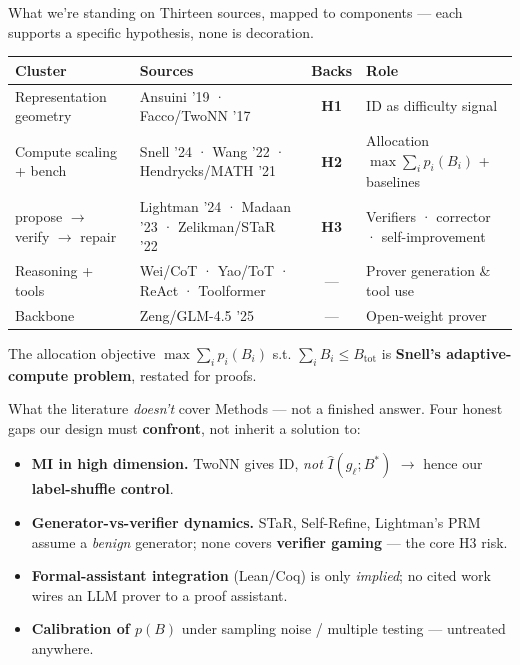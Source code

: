 \documentclass[aspectratio=169,12pt,t,compress]{beamer}
\begin{document}
\begin{frame}{What we're standing on}
	Thirteen sources, mapped to components --- each supports a specific
	hypothesis, none is decoration.

	\vspace{0.4em}
	\begin{center}
		\scriptsize
		\renewcommand{\arraystretch}{1.2}
		\begin{tabular}{p{2.7cm} p{4.1cm} c p{3.4cm}}
			\toprule
			\textbf{Cluster} & \textbf{Sources} & \textbf{Backs} & \textbf{Role} \\
			\midrule
			Representation geometry & Ansuini '19 · Facco/TwoNN '17 & \textbf{H1} & ID as difficulty signal \\
			Compute scaling + bench & Snell '24 · Wang '22 · Hendrycks/MATH '21 & \textbf{H2} & Allocation $\max\sum_i p_i(B_i)$ + baselines \\
			propose $\to$ verify $\to$ repair & Lightman '24 · Madaan '23 · Zelikman/STaR '22 & \textbf{H3} & Verifiers · corrector · self-improvement \\
			Reasoning + tools & Wei/CoT · Yao/ToT · ReAct · Toolformer & --- & Prover generation \& tool use \\
			Backbone & Zeng/GLM-4.5 '25 & --- & Open-weight prover \\
			\bottomrule
		\end{tabular}
	\end{center}

	\vspace{0.3em}
	\footnotesize The allocation objective
	$\max\sum_i p_i(B_i)$ s.t. $\sum_i B_i \le B_\text{tot}$ is
	\textbf{Snell's adaptive-compute problem}, restated for proofs.
\end{frame}

\begin{frame}{What the literature \emph{doesn't} cover}
	Methods --- not a finished answer. Four honest gaps our design must
	\textbf{confront}, not inherit a solution to:

	\vspace{0.4em}
	\begin{itemize}\footnotesize
		\item \textbf{MI in high dimension.} TwoNN gives ID, \emph{not}
		      $\hat{I}(g_\ell; B^*)$ $\to$ hence our \textbf{label-shuffle control}.
		\item \textbf{Generator-vs-verifier dynamics.} STaR, Self-Refine, Lightman's
		      PRM assume a \emph{benign} generator; none covers \textbf{verifier
		      gaming} --- the core H3 risk.
		\item \textbf{Formal-assistant integration} (Lean/Coq) is only \emph{implied};
		      no cited work wires an LLM prover to a proof assistant.
		\item \textbf{Calibration of $p(B)$} under sampling noise / multiple
		      testing --- untreated anywhere.
	\end{itemize}
\end{frame}
\end{document}
